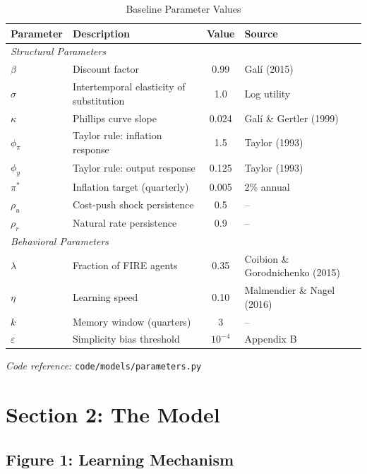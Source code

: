 \documentclass[11pt]{article}
\begin{document}
\begin{table}[htbp]
\centering
\caption{Baseline Parameter Values}
\label{tab:baseline_params}
\begin{threeparttable}
\begin{tabular}{llcl}
\toprule
Parameter & Description & Value & Source \\
\midrule
\multicolumn{4}{l}{\textit{Structural Parameters}} \\
$\beta$ & Discount factor & 0.99 & Gal\'i (2015) \\
$\sigma$ & Intertemporal elasticity of substitution & 1.0 & Log utility \\
$\kappa$ & Phillips curve slope & 0.024 & Gal\'i \& Gertler (1999) \\
$\phi_\pi$ & Taylor rule: inflation response & 1.5 & Taylor (1993) \\
$\phi_y$ & Taylor rule: output response & 0.125 & Taylor (1993) \\
$\pi^*$ & Inflation target (quarterly) & 0.005 & 2\% annual \\
$\rho_u$ & Cost-push shock persistence & 0.5 & -- \\
$\rho_r$ & Natural rate persistence & 0.9 & -- \\
\midrule
\multicolumn{4}{l}{\textit{Behavioral Parameters}} \\
$\lambda$ & Fraction of FIRE agents & 0.35 & Coibion \& Gorodnichenko (2015) \\
$\eta$ & Learning speed & 0.10 & Malmendier \& Nagel (2016) \\
$k$ & Memory window (quarters) & 3 & -- \\
$\varepsilon$ & Simplicity bias threshold & $10^{-4}$ & Appendix B \\
\bottomrule
\end{tabular}
\begin{tablenotes}
\small
\item \textit{Code reference:} \texttt{code/models/parameters.py}
\end{tablenotes}
\end{threeparttable}
\end{table}

\section{Section 2: The Model}
\label{sec:model_results}

\subsection{Figure 1: Learning Mechanism}
\end{document}
